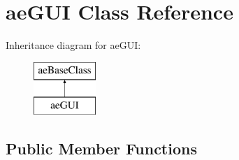 \hypertarget{classae_g_u_i}{}\section{ae\+G\+UI Class Reference}
\label{classae_g_u_i}
Inheritance diagram for ae\+G\+UI\+:\begin{figure}[H]
\begin{center}
\leavevmode
\includegraphics[height=2.000000cm]{classae_g_u_i}
\end{center}
\end{figure}
\subsection*{Public Member Functions}
